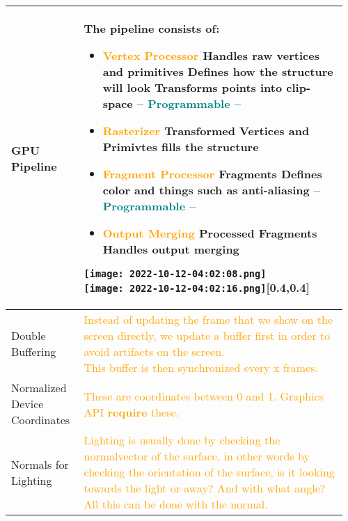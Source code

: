 \documentclass[main.tex,fontsize=8pt,paper=a4,paper=portrait,DIV=calc,]{scrartcl}
\begin{document}
\begin{table}[ht!]
\begin{tabular}{|m{0.2\linewidth}|m{0.755\linewidth}|}
\hline
GPU Pipeline & \minipg{
The pipeline consists of:\newline
\begin{itemize}
  \item \textcolor{orange}{Vertex Processor}\newline 
    Handles raw vertices and primitives\newline
    Defines how the structure will look\newline
    Transforms points into clip-space\newline
    \textcolor{teal}{-- Programmable --}
  \item \textcolor{orange}{Rasterizer} \newline
    Transformed Vertices and Primivtes\newline
    fills the structure
  \item \textcolor{orange}{Fragment Processor} \newline
    Fragments\newline
    Defines color and things such as anti-aliasing\newline
    \textcolor{teal}{-- Programmable --}
  \item \textcolor{orange}{Output Merging} \newline
    Processed Fragments\newline
    Handles output merging
\end{itemize}
}{\texttt{[image: 2022-10-12-04:02:08.png]}\newline
\texttt{[image: 2022-10-12-04:02:16.png]}}[0.4,0.4]\\
\hline
  Double Buffering & 
  \textcolor{orange}{Instead of updating the frame that we show on the screen directly, we update a buffer first in order to avoid artifacts on the screen.\newline
  This buffer is then synchronized every x frames.\newline}\\
\hline
  Normalized Device Coordinates & 
  \textcolor{orange}{These are coordinates between 0 and 1. Graphics API \textbf{require} these.}\\
\hline
  Normals for Lighting & 
  \textcolor{orange}{Lighting is usually done by checking the normalvector of the surface, in other words by checking the orientation of the surface, is it looking towards the light or away? And with what angle?\newline
  All this can be done with the normal.}\newline

\end{tabular}
\end{table}
\end{document}
